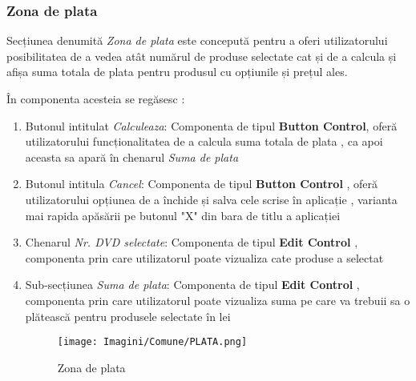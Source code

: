 \documentclass{amsart}
\begin{document}
\hfill \newline

\newpage %

\subsubsection{\textbf{Zona de plata}}\hfill

Secțiunea denumită \textit{Zona de plata} este concepută pentru a oferi utilizatorului posibilitatea de a vedea atât numărul de produse selectate cat și de a calcula și afișa suma totala de plata pentru produsul cu opțiunile și prețul ales.

\hfill \newline

În componenta acesteia se regăsesc :

\hfill \newline

\begin{enumerate}[label=\arabic*.]
\item Butonul intitulat \textit{Calculeaza}: Componenta de tipul \textbf{Button Control}, oferă utilizatorului funcționalitatea de a calcula suma totala de plata , ca apoi aceasta sa apară în chenarul \textit{Suma de plata}
\hfill \newline

\item Butonul intitula \textit{Cancel}: Componenta de tipul \textbf{Button Control} , oferă utilizatorului opțiunea de a închide și salva cele scrise în aplicație , varianta mai rapida apăsării pe butonul "X" din bara de titlu a aplicației 
\hfill \newline

\item Chenarul \textit{Nr. DVD selectate}: Componenta de tipul \textbf{Edit Control} , componenta prin care utilizatorul poate vizualiza cate produse a selectat
\hfill \newline

\item Sub-secțiunea \textit{Suma de plata}: Componenta de tipul \textbf{Edit Control} , componenta prin care utilizatorul poate vizualiza suma pe care va trebuii sa o plătească pentru produsele selectate în lei
\hfill \newline


\begin{figure}[h]
\centering
\texttt{[image: Imagini/Comune/PLATA.png]}
\caption{Zona de plata}
\end{figure}


\hfill \newline

\end{enumerate}
\end{document}
